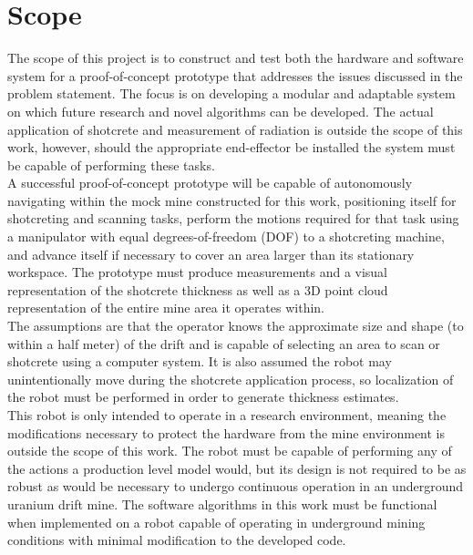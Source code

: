 \section{Scope}
\label{sec:scope}

The scope of this project is to construct and test both the hardware and software system for a proof-of-concept prototype that addresses the issues discussed in the problem statement. The focus is on developing a modular and adaptable system on which future research and novel algorithms can be developed. The actual application of shotcrete and measurement of radiation is outside the scope of this work, however, should the appropriate end-effector be installed the system must be capable of performing these tasks.\\

A successful proof-of-concept prototype will be capable of autonomously navigating within the mock mine constructed for this work, positioning itself for shotcreting and scanning tasks, perform the motions required for that task using a manipulator with equal degrees-of-freedom (DOF) to a shotcreting machine, and advance itself if necessary to cover an area larger than its stationary workspace. The prototype must produce measurements and a visual representation of the shotcrete thickness as well as a 3D point cloud representation of the entire mine area it operates within.\\

The assumptions are that the operator knows the approximate size and shape (to within a half meter) of the drift and is capable of selecting an area to scan or shotcrete using a computer system. It is also assumed the robot may unintentionally move during the shotcrete application process, so localization of the robot must be performed in order to generate thickness estimates.\\

This robot is only intended to operate in a research environment, meaning the modifications necessary to protect the hardware from the mine environment is outside the scope of this work. The robot must be capable of performing any of the actions a production level model would, but its design is not required to be as robust as would be necessary to undergo continuous operation in an underground uranium drift mine. The software algorithms in this work must be functional when implemented on a robot capable of operating in underground mining conditions with minimal modification to the developed code.\\

